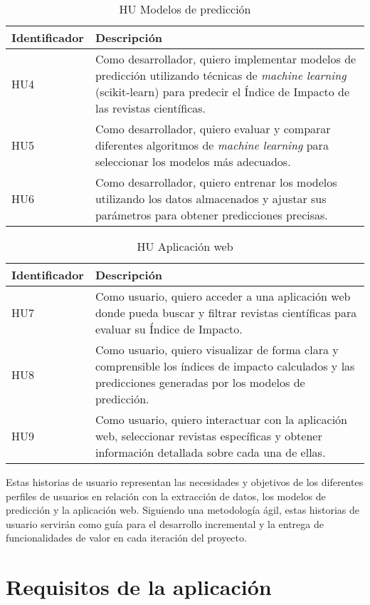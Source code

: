 \begin{table}[h]
\centering
\begin{tabular}{p{3cm}p{8cm}}
\toprule
\textbf{Identificador} & \textbf{Descripción} \\
\toprule
HU4 & Como desarrollador, quiero implementar modelos de predicción utilizando técnicas de \textit{machine learning} (scikit-learn) para predecir el Índice de Impacto de las revistas científicas. \\
\midrule
HU5 & Como desarrollador, quiero evaluar y comparar diferentes algoritmos de \textit{machine learning} para seleccionar los modelos más adecuados. \\
\midrule
HU6 & Como desarrollador, quiero entrenar los modelos utilizando los datos almacenados y ajustar sus parámetros para obtener predicciones precisas. \\
\bottomrule
\end{tabular}
\caption{HU Modelos de predicción}
\label{tab:Modelos de predicción}
\end{table}


\begin{table}[h]
\centering
\begin{tabular}{p{3cm}p{8cm}}
\toprule
\textbf{Identificador} & \textbf{Descripción} \\
\toprule
HU7 & Como usuario, quiero acceder a una aplicación web donde pueda buscar y filtrar revistas científicas para evaluar su Índice de Impacto. \\
\midrule
HU8 & Como usuario, quiero visualizar de forma clara y comprensible los índices de impacto calculados y las predicciones generadas por los modelos de predicción. \\
\midrule
HU9 & Como usuario, quiero interactuar con la aplicación web, seleccionar revistas específicas y obtener información detallada sobre cada una de ellas. \\
\bottomrule
\end{tabular}
\caption{HU Aplicación web}
\label{tab:Aplicación web}
\end{table}

Estas historias de usuario representan las necesidades y objetivos de los diferentes perfiles de usuarios en relación con la extracción de datos, los modelos de predicción y la aplicación web. Siguiendo una metodología ágil, estas historias de usuario servirán como guía para el desarrollo incremental y la entrega de funcionalidades de valor en cada iteración del proyecto.

\newpage
\section{Requisitos de la aplicación}
\label{sec:Requisitos de aplicación}

